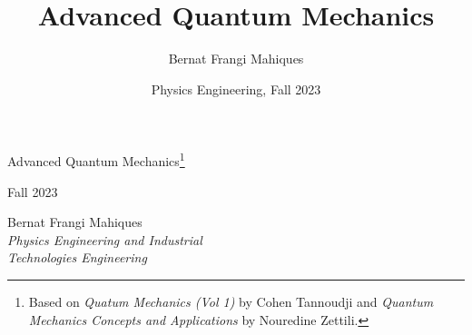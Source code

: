 \documentclass[a4paper,11pt,final]{article}
\title{Advanced Quantum Mechanics}
\date{Physics Engineering, Fall 2023}
\author{Bernat Frangi Mahiques}
\begin{document}
\begin{titlepage}
    \centering\Large\null\vfill

    {\Huge Advanced Quantum Mechanics\footnote{Based on \textit{Quatum Mechanics (Vol 1)} by Cohen Tannoudji and \textit{Quantum Mechanics Concepts and Applications} by Nouredine Zettili.}}\\ 
    \vspace{1em}

    Fall 2023\\
    \vskip8cm

    Bernat Frangi Mahiques\\

    \emph{Physics Engineering and Industrial\\Technologies Engineering}\\
    \vskip4cm
\end{titlepage}

\newpage
\pagestyle{plain}    
\tableofcontents
\newpage


\end{document}

